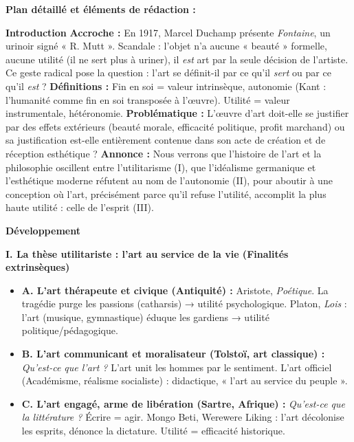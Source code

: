 \documentclass[11pt]{article}
\begin{document}
\begin{exoresolu}
\textbf{Plan détaillé et éléments de rédaction :}

\textbf{Introduction}
\textbf{Accroche :} En 1917, Marcel Duchamp présente \emph{Fontaine}, un urinoir signé « R. Mutt ». Scandale : l'objet n'a aucune « beauté » formelle, aucune utilité (il ne sert plus à uriner), il \emph{est} art par la seule décision de l'artiste. Ce geste radical pose la question : l'art se définit-il par ce qu'il \emph{sert} ou par ce qu'il \emph{est} ?
\textbf{Définitions :} Fin en soi = valeur intrinsèque, autonomie (Kant : l'humanité comme fin en soi transposée à l'œuvre). Utilité = valeur instrumentale, hétéronomie.
\textbf{Problématique :} L'œuvre d'art doit-elle se justifier par des effets extérieurs (beauté morale, efficacité politique, profit marchand) ou sa justification est-elle entièrement contenue dans son acte de création et de réception esthétique ?
\textbf{Annonce :} Nous verrons que l'histoire de l'art et la philosophie oscillent entre l'utilitarisme (I), que l'idéalisme germanique et l'esthétique moderne réfutent au nom de l'autonomie (II), pour aboutir à une conception où l'art, précisément parce qu'il refuse l'utilité, accomplit la plus haute utilité : celle de l'esprit (III).

\textbf{Développement}

\textbf{I. La thèse utilitariste : l'art au service de la vie (Finalités extrinsèques)}
\begin{itemize}
    \item \textbf{A. L'art thérapeute et civique (Antiquité) :} Aristote, \emph{Poétique}. La tragédie purge les passions (catharsis) → utilité psychologique. Platon, \emph{Lois} : l'art (musique, gymnastique) éduque les gardiens → utilité politique/pédagogique.
    \item \textbf{B. L'art communicant et moralisateur (Tolstoï, art classique) :} \emph{Qu'est-ce que l'art ?} L'art unit les hommes par le sentiment. L'art officiel (Académisme, réalisme socialiste) : didactique, « l'art au service du peuple ».
    \item \textbf{C. L'art engagé, arme de libération (Sartre, Afrique) :} \emph{Qu'est-ce que la littérature ?} Écrire = agir. Mongo Beti, Werewere Liking : l'art décolonise les esprits, dénonce la dictature. Utilité = efficacité historique.
\end{itemize}


\end{exoresolu}
\end{document}
